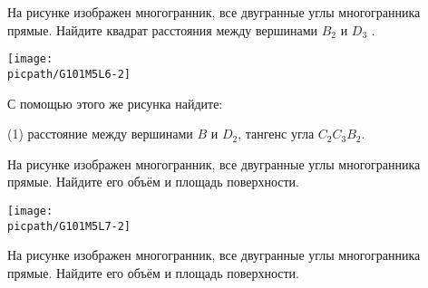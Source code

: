 \begin{class}[number=2]
	\begin{listofex}
		\item 
		\begin{minipage}[t]{\bodywidth}
			На рисунке изображен многогранник, все двугранные углы многогранника прямые. Найдите квадрат расстояния между вершинами \(B_2\) и \(D_3\) .
		\end{minipage}
		\hspace{0.02\linewidth}
		\begin{minipage}[t]{\picwidth}
			\texttt{[image: \\picpath/G101M5L6-2]}
		\end{minipage}
		\item С помощью этого же рисунка найдите:
		\begin{tasks}(1)
			\task расстояние между вершинами \(B\) и \(D_2\),
			\task тангенс угла \(C_2C_3B_2\).
		\end{tasks}
		\item 
		\begin{minipage}[t]{\bodywidth}
			На рисунке изображен многогранник, все двугранные углы многогранника прямые. Найдите его объём и площадь поверхности.
		\end{minipage}
		\hspace{0.02\linewidth}
		\begin{minipage}[t]{\picwidth}
			\texttt{[image: \\picpath/G101M5L7-2]}
		\end{minipage}
		\item 
		\begin{minipage}[t]{\bodywidth}
			На рисунке изображен многогранник, все двугранные углы многогранника прямые. Найдите его объём и площадь поверхности.
		\end{minipage}
		\hspace{0.02\linewidth}

\end{listofex}
\end{class}
